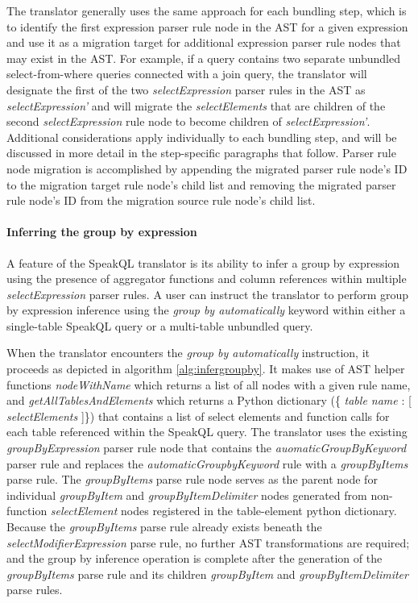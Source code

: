 The translator generally uses the same approach for each bundling step, which is to identify the first expression parser rule node in the AST for a given expression and use it as a migration target for additional expression parser rule nodes that may exist in the AST. For example, if a query contains two separate unbundled select-from-where queries connected with a join query, the translator will designate the first of the two \emph{selectExpression} parser rules in the AST as \emph{selectExpression'} and will migrate the \emph{selectElements} that are children of the second \emph{selectExpression} rule node to become children of \emph{selectExpression'}. Additional considerations apply individually to each bundling step, and will be discussed in more detail in the step-specific paragraphs that follow. Parser rule node migration is accomplished by appending the migrated parser rule node's ID to the migration target rule node's child list and removing the migrated parser rule node's ID from the migration source rule node's child list.

\paragraph{Inferring the group by expression}

A feature of the SpeakQL translator is its ability to infer a group by expression using the presence of aggregator functions and column references within multiple \emph{selectExpression} parser rules. A user can instruct the translator to perform group by expression inference using the \emph{group by automatically} keyword within either a single-table SpeakQL query or a multi-table unbundled query.

\TransformFunctionInferGroupBy

When the translator encounters the \emph{group by automatically} instruction, it proceeds as depicted in algorithm \ref{alg:infergroupby}. It makes use of AST helper functions \emph{nodeWithName} which returns a list of all nodes with a given rule name, and \emph{getAllTablesAndElements} which returns a Python dictionary (\{ \emph{table name} : [ \emph{selectElements} ]\}) that contains a list of select elements and function calls for each table referenced within the SpeakQL query. The translator uses the existing \emph{groupByExpression} parser rule node that contains the \emph{auomaticGroupByKeyword} parser rule and replaces the \emph{automaticGroupbyKeyword} rule with a \emph{groupByItems} parse rule. The \emph{groupByItems} parse rule node serves as the parent node for individual \emph{groupByItem} and \emph{groupByItemDelimiter} nodes generated from non-function \emph{selectElement} nodes registered in the table-element python dictionary. Because the \emph{groupByItems} parse rule already exists beneath the \emph{selectModifierExpression} parse rule, no further AST transformations are required; and the group by inference operation is complete after the generation of the \emph{groupByItems} parse rule and its children \emph{groupByItem} and \emph{groupByItemDelimiter} parse rules.

